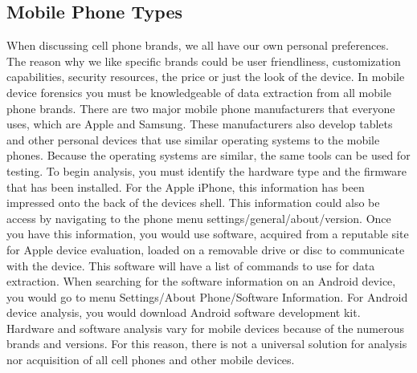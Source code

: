 \documentclass[acmlarge]{acmart}
\begin{document}
\subsection{Mobile Phone Types}
When discussing cell phone brands, we all have our own personal preferences.  The reason why we like specific brands could be user friendliness, customization capabilities, security resources, the price or just the look of the device.  In mobile device forensics you must be knowledgeable of data extraction from all mobile phone brands.  There are two major mobile phone manufacturers that everyone uses, which are Apple and Samsung.  These manufacturers also develop tablets and other personal devices that use similar operating systems to the mobile phones.  Because the operating systems are similar, the same tools can be used for testing.  To begin analysis, you must identify the hardware type and the firmware that has been installed.  For the Apple iPhone, this information has been impressed onto the back of the devices shell.  This information could also be access by navigating to the phone menu settings/general/about/version.   Once you have this information, you would use software, acquired from a reputable site for Apple device evaluation, loaded on a removable drive or disc to communicate with the device.  This software will have a list of commands to use for data extraction.  When searching for the software information on an Android device, you would go to menu Settings/About Phone/Software Information.  For Android device analysis, you would download Android software development kit.  Hardware and software analysis vary for mobile devices because of the numerous brands and versions.  For this reason, there is not a universal solution for analysis nor acquisition of all cell phones and other mobile devices.
\end{document}
